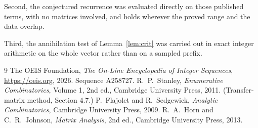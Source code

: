 \documentclass[11pt,a4paper]{article}
\theoremstyle{plain}
\theoremstyle{definition}
\begin{document}
Second, the conjectured recurrence was evaluated directly on those published terms, with no
matrices involved, and holds wherever the proved range and the data overlap.

Third, the annihilation test of Lemma~\ref{lem:crit} was carried out in exact integer
arithmetic on the whole vector rather than on a sampled prefix.

\begin{thebibliography}{9}
 The OEIS Foundation, \emph{The On-Line Encyclopedia of Integer
Sequences}, \url{https://oeis.org}, 2026. Sequence A258727.
 R.~P.~Stanley, \emph{Enumerative Combinatorics}, Volume 1, 2nd ed.,
Cambridge University Press, 2011. (Transfer-matrix method, Section 4.7.)
 P.~Flajolet and R.~Sedgewick, \emph{Analytic Combinatorics}, Cambridge
University Press, 2009.
 R.~A.~Horn and C.~R.~Johnson, \emph{Matrix Analysis}, 2nd ed., Cambridge
University Press, 2013.
\end{thebibliography}
\end{document}
